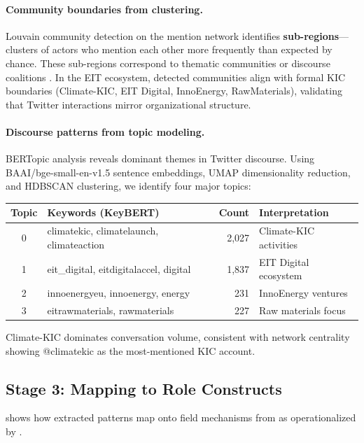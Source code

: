 \documentclass[../main.tex]{subfiles}
\begin{document}
\paragraph{Community boundaries from clustering.}
Louvain community detection on the mention network identifies
\textbf{sub-regions}---clusters of actors who mention each other more
frequently than expected by chance.
These sub-regions correspond to thematic communities or discourse coalitions
\parencite{benabdelkrim-opening-fields-2020}.
In the EIT ecosystem, detected communities align with formal KIC boundaries
(Climate-KIC, EIT Digital, InnoEnergy, RawMaterials), validating that
Twitter interactions mirror organizational structure.

\paragraph{Discourse patterns from topic modeling.}
BERTopic analysis reveals dominant themes in Twitter discourse.
Using BAAI/bge-small-en-v1.5 sentence embeddings, UMAP dimensionality
reduction, and HDBSCAN clustering, we identify four major topics:

\tableminimal
\begin{center}
\begin{tabular}{@{}clrl@{}}
\toprule
\textbf{Topic} & \textbf{Keywords (KeyBERT)} & \textbf{Count} & \textbf{Interpretation} \\
\midrule
0 & climatekic, climatelaunch, climateaction & 2,027 & Climate-KIC activities \\
1 & eit\_digital, eitdigitalaccel, digital & 1,837 & EIT Digital ecosystem \\
2 & innoenergyeu, innoenergy, energy & 231 & InnoEnergy ventures \\
3 & eitrawmaterials, rawmaterials & 227 & Raw materials focus \\
\bottomrule
\end{tabular}
\end{center}

Climate-KIC dominates conversation volume, consistent with network
centrality showing @climatekic as the most-mentioned KIC account.

\subsection{Stage 3: Mapping to Role Constructs}

 shows how extracted patterns map onto
field mechanisms from \textcite{powell2017organizational} as operationalized
by \textcite{benabdelkrim-opening-fields-2020}.
\end{document}
